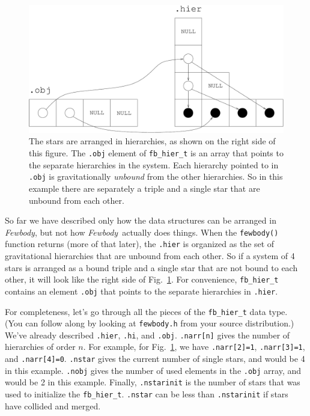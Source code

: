 \documentclass[10pt,preprint]{aastex} %
\newcommand{\Fewbody}{{\em Fewbody\/}}
\begin{document}
\begin{figure}
  \begin{center}
    \includegraphics[scale=0.3]{obj_and_hier.pdf}
    \caption{The stars are arranged in hierarchies, as shown on the right side of this
      figure.  The {\tt .obj} element of {\tt fb\_hier\_t} is an array that points to the 
      separate hierarchies in the system.  Each hierarchy pointed to in {\tt .obj} is 
      gravitationally {\em unbound} from the other hierarchies.  So in this example
      there are separately a triple and a single star that are unbound from each other.
      \label{fig:obj_and_hier}}
  \end{center}
\end{figure}

So far we have described only how the data structures can be arranged in \Fewbody, but not how \Fewbody\
actually does things.  When the {\tt fewbody()} function returns (more of that later), 
the {\tt .hier} is organized as the set of gravitational hierarchies that are unbound from 
each other.  So if a system of 4 stars is arranged as a bound triple and a single star that
are not bound to each other, it will look like the right side of Fig.\ \ref{fig:obj_and_hier}.
For convenience, {\tt fb\_hier\_t} contains an element {\tt .obj} that points to the separate
hierarchies in {\tt .hier}.

For completeness, let's go through all the pieces of the {\tt fb\_hier\_t} data type.
(You can follow along by looking at {\tt fewbody.h} from your source distribution.)
We've already described {\tt .hier}, {\tt .hi}, and {\tt .obj}.  {\tt .narr[n]} gives
the number of hierarchies of order $n$.  For example, for Fig.\ \ref{fig:obj_and_hier},
we have {\tt .narr[2]=1}, {\tt .narr[3]=1}, and {\tt .narr[4]=0}.  {\tt .nstar} gives
the current number of single stars, and would be 4 in this example.  {\tt .nobj} gives
the number of used elements in the {\tt .obj} array, and would be 2 in this example.
Finally, {\tt .nstarinit} is the number of stars that was used to initialize the 
{\tt fb\_hier\_t}.  {\tt .nstar} can be less than {\tt .nstarinit} if stars have
collided and merged.
\end{document}
